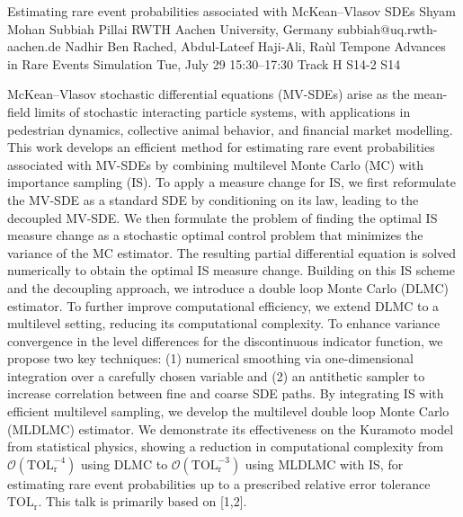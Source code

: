 \begin{talk}
  {Estimating rare event probabilities associated with McKean--Vlasov SDEs}%
  {Shyam Mohan Subbiah Pillai}%
  {RWTH Aachen University, Germany}%
  {subbiah@uq.rwth-aachen.de}%
  {Nadhir Ben Rached, Abdul-Lateef Haji-Ali, Raùl Tempone}%
  {Advances in Rare Events Simulation}%
  {Tue, July 29 15:30–17:30 Track H}%
  {S14-2}%
  {S14}%
				
			
McKean–Vlasov stochastic differential equations (MV-SDEs) arise as the mean-field limits of stochastic interacting particle systems, with applications in pedestrian dynamics, collective animal behavior, and financial market modelling. This work develops an efficient method for estimating rare event probabilities associated with MV-SDEs by combining multilevel Monte Carlo (MC) with importance sampling (IS). To apply a measure change for IS, we first reformulate the MV-SDE as a standard SDE by conditioning on its law, leading to the decoupled MV-SDE. We then formulate the problem of finding the optimal IS measure change as a stochastic optimal control problem that minimizes the variance of the MC estimator. The resulting partial differential equation is solved numerically to obtain the optimal IS measure change. Building on this IS scheme and the decoupling approach, we introduce a double loop Monte Carlo (DLMC) estimator. To further improve computational efficiency, we extend DLMC to a multilevel setting, reducing its computational complexity. To enhance variance convergence in the level differences for the discontinuous indicator function, we propose two key techniques: (1) numerical smoothing via one-dimensional integration over a carefully chosen variable and (2) an antithetic sampler to increase correlation between fine and coarse SDE paths. By integrating IS with efficient multilevel sampling, we develop the multilevel double loop Monte Carlo (MLDLMC) estimator. We demonstrate its effectiveness on the Kuramoto model from statistical physics, showing a reduction in computational complexity from $\mathcal{O}(\mathrm{TOL}_\mathrm{r}^{-4})$ using DLMC to $\mathcal{O}(\mathrm{TOL}_\mathrm{r}^{-3})$ using MLDLMC with IS, for estimating rare event probabilities up to a prescribed relative error tolerance $\mathrm{TOL}_\mathrm{r}$. This talk is primarily based on [1,2].

\medskip


\end{talk}
